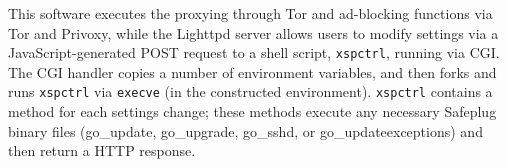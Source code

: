 \documentclass[letterpaper,twocolumn,10pt]{article}
\begin{document}
%

This software executes the proxying through Tor and ad-blocking functions via Tor and Privoxy, while the Lighttpd server allows users to modify settings via a JavaScript-generated POST request to a shell script, {\tt xspctrl}, running via CGI.  The CGI handler copies a number of environment variables, and then forks and runs {\tt xspctrl} via {\tt execve} (in the constructed environment). {\tt xspctrl} contains a method for each settings change; these methods execute any necessary Safeplug binary files (go\_update, go\_upgrade, go\_sshd, or go\_updateexceptions) and then return a HTTP response.


    
\end{document}

